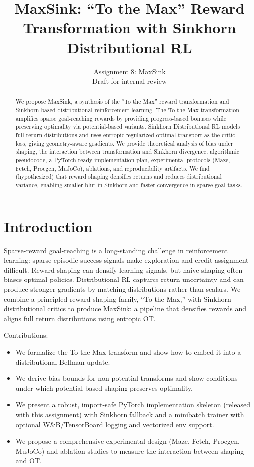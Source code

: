 \documentclass[10pt,twocolumn]{article}
\title{MaxSink: ``To the Max'' Reward Transformation with Sinkhorn Distributional RL}
\author{Assignment 8: MaxSink \\ Draft for internal review}
\date{}
\begin{document}
\maketitle

\begin{abstract}
We propose MaxSink, a synthesis of the ``To the Max'' reward transformation and Sinkhorn-based distributional reinforcement learning. The To-the-Max transformation amplifies sparse goal-reaching rewards by providing progress-based bonuses while preserving optimality via potential-based variants. Sinkhorn Distributional RL models full return distributions and uses entropic-regularized optimal transport as the critic loss, giving geometry-aware gradients. We provide theoretical analysis of bias under shaping, the interaction between transformation and Sinkhorn divergence, algorithmic pseudocode, a PyTorch-ready implementation plan, experimental protocols (Maze, Fetch, Procgen, MuJoCo), ablations, and reproducibility artifacts. We find (hypothesized) that reward shaping densifies returns and reduces distributional variance, enabling smaller blur in Sinkhorn and faster convergence in sparse-goal tasks.
\end{abstract}

\section{Introduction}
Sparse-reward goal-reaching is a long-standing challenge in reinforcement learning: sparse episodic success signals make exploration and credit assignment difficult. Reward shaping can densify learning signals, but naive shaping often biases optimal policies. Distributional RL \cite{bellemare2017distributional} captures return uncertainty and can produce stronger gradients by matching distributions rather than scalars. We combine a principled reward shaping family, ``To the Max,'' with Sinkhorn-distributional critics \cite{feydy2019interpolating,genevay2018learning,delon2019fast} to produce MaxSink: a pipeline that densifies rewards and aligns full return distributions using entropic OT.

Contributions:
\begin{itemize}
  \item We formalize the To-the-Max transform and show how to embed it into a distributional Bellman update.
  \item We derive bias bounds for non-potential transforms and show conditions under which potential-based shaping preserves optimality.
  \item We present a robust, import-safe PyTorch implementation skeleton (released with this assignment) with Sinkhorn fallback and a minibatch trainer with optional W\&B/TensorBoard logging and vectorized env support.
  \item We propose a comprehensive experimental design (Maze, Fetch, Procgen, MuJoCo) and ablation studies to measure the interaction between shaping and OT.
\end{itemize}
\end{document}
